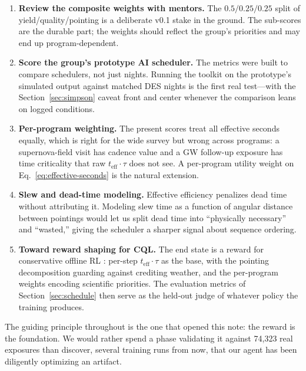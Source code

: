 \documentclass[11pt]{article}
\newcommand{\teff}{t_{\mathrm{eff}}}
\begin{document}
\begin{enumerate}
  \item \textbf{Review the composite weights with mentors.} The $0.5/0.25/0.25$
    split of yield/quality/pointing is a deliberate v0.1 stake in the ground. The
    sub-scores are the durable part; the weights should reflect the group's
    priorities and may end up program-dependent.
  \item \textbf{Score the group's prototype AI scheduler.} The metrics were built to
    compare schedulers, not just nights. Running the toolkit on the prototype's
    simulated output against matched DES nights is the first real test---with the
    Section~\ref{sec:simpson} caveat front and center whenever the comparison leans
    on logged conditions.
  \item \textbf{Per-program weighting.} The present scores treat all effective
    seconds equally, which is right for the wide survey but wrong across programs: a
    supernova-field visit has cadence value and a GW follow-up exposure has time
    criticality that raw $\teff\cdot\tau$ does not see. A per-program utility weight
    on Eq.~\eqref{eq:effective-seconds} is the natural extension.
  \item \textbf{Slew and dead-time modeling.} Effective efficiency penalizes dead
    time without attributing it. Modeling slew time as a function of angular
    distance between pointings would let us split dead time into ``physically
    necessary'' and ``wasted,'' giving the scheduler a sharper signal about sequence
    ordering.
  \item \textbf{Toward reward shaping for CQL.} The end state is a reward for
    conservative offline RL \citep{kumar2020}: per-step $\teff\cdot\tau$ as the
    base, with the pointing decomposition guarding against crediting weather, and
    the per-program weights encoding scientific priorities. The evaluation metrics
    of Section~\ref{sec:schedule} then serve as the held-out judge of whatever
    policy the training produces.
\end{enumerate}

The guiding principle throughout is the one that opened this note: the reward is the
foundation. We would rather spend a phase validating it against 74{,}323 real
exposures than discover, several training runs from now, that our agent has been
diligently optimizing an artifact.
\end{document}
